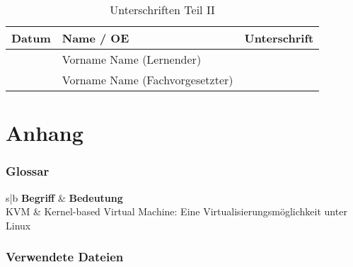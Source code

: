 \documentclass[a4paper,11pt,oneside]{report}
\begin{document}
\begin{table}
\begin{tabularx}{\textwidth}{ |X|X|X| }
\hline
Datum & Name / OE & Unterschrift \\ \hline
 & Vorname Name (Lernender) & \\[5ex] \hline
 & Vorname Name (Fachvorgesetzter) & \\[5ex] \hline
\end{tabularx}
\caption{Unterschriften Teil II}
\end{table}

\part{Anhang}                                                                                                                                                                                                                                       
\section{Glossar}
\begin{tabularx}{\textwidth}{s|b}
\textbf{Begriff} & \textbf{Bedeutung} \\
KVM & Kernel-based Virtual Machine: Eine Virtualisierungsmöglichkeit unter Linux \\
\end{tabularx}
\pagebreak
\section{Verwendete Dateien}

\end{document}
